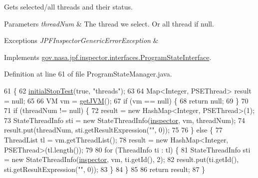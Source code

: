 Gets selected/all threads and their status. 


\begin{DoxyParams}{Parameters}
{\em thread\+Num} & The thread we select. Or all thread if null. \\
\hline
\end{DoxyParams}

\begin{DoxyExceptions}{Exceptions}
{\em J\+P\+F\+Inspector\+Generic\+Error\+Exception} & \\
\hline
\end{DoxyExceptions}


Implements \hyperlink{interfacegov_1_1nasa_1_1jpf_1_1inspector_1_1interfaces_1_1_program_state_interface_a54531453dd2373d8f9f166a79547495a}{gov.\+nasa.\+jpf.\+inspector.\+interfaces.\+Program\+State\+Interface}.



Definition at line 61 of file Program\+State\+Manager.\+java.


\begin{DoxyCode}
61                                                                                              \{
62     \hyperlink{classgov_1_1nasa_1_1jpf_1_1inspector_1_1server_1_1programstate_1_1_program_state_manager_a37515b553e6100226774a8fe54725a6b}{initialStopTest}(\textcolor{keyword}{true}, \textcolor{stringliteral}{"threads"});
63 
64     Map<Integer, PSEThread> result = null;
65 
66     VM vm = \hyperlink{classgov_1_1nasa_1_1jpf_1_1inspector_1_1server_1_1programstate_1_1_program_state_manager_a64f4af50fdeccedaf6e9b832feb6e489}{getJVM}();
67     \textcolor{keywordflow}{if} (vm == null) \{
68       \textcolor{keywordflow}{return} null;
69     \}
70 
71     \textcolor{keywordflow}{if} (threadNum != null) \{
72       result = \textcolor{keyword}{new} HashMap<Integer, PSEThread>(1);
73       StateThreadInfo sti = \textcolor{keyword}{new} StateThreadInfo(\hyperlink{classgov_1_1nasa_1_1jpf_1_1inspector_1_1server_1_1programstate_1_1_program_state_manager_a7f6b466bef8fa70a70390311e477f942}{inspector}, vm, threadNum);
74       result.put(threadNum, sti.getResultExpression(\textcolor{stringliteral}{""}, 0));
75 
76     \} \textcolor{keywordflow}{else} \{
77       ThreadList tl = vm.getThreadList();
78       result = \textcolor{keyword}{new} HashMap<Integer, PSEThread>(tl.length());
79 
80       \textcolor{keywordflow}{for} (ThreadInfo ti : tl) \{
81         StateThreadInfo sti = \textcolor{keyword}{new} StateThreadInfo(\hyperlink{classgov_1_1nasa_1_1jpf_1_1inspector_1_1server_1_1programstate_1_1_program_state_manager_a7f6b466bef8fa70a70390311e477f942}{inspector}, vm, ti.getId(), 2);
82         result.put(ti.getId(), sti.getResultExpression(\textcolor{stringliteral}{""}, 0));
83       \}
84     \}
85 
86     \textcolor{keywordflow}{return} result;
87   \}
\end{DoxyCode}
